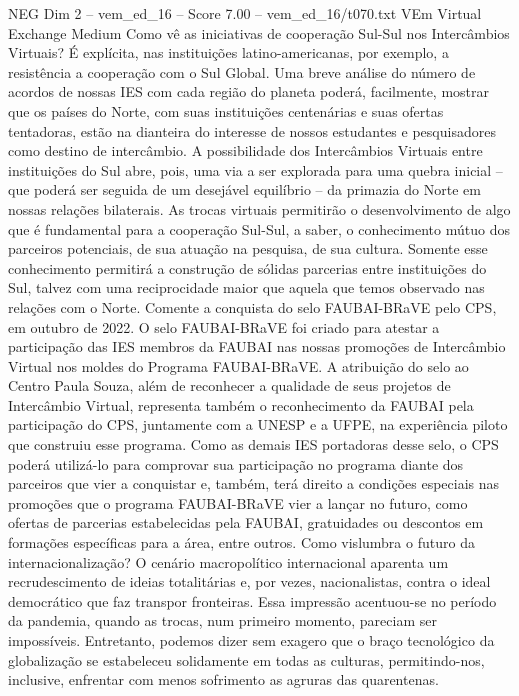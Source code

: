 \begin{textsample}{NEG Dim 2 – vem\_ed\_16 – Score 7.00 – vem\_ed\_16/t070.txt}  \label{ex:f2_neg_105}
VEm Virtual Exchange Medium Como vê as iniciativas de cooperação Sul-Sul nos Intercâmbios Virtuais?
É explícita, nas instituições latino-americanas, por exemplo, a resistência a cooperação com o Sul Global.
Uma breve análise do número de acordos de nossas IES com cada região do planeta poderá, facilmente, mostrar que os países do Norte, com suas instituições centenárias e suas ofertas tentadoras, estão na dianteira do interesse de nossos estudantes e pesquisadores como destino de intercâmbio.
A possibilidade dos Intercâmbios Virtuais entre instituições do Sul abre, pois, uma via a ser explorada para uma quebra inicial – que poderá ser seguida de um desejável equilíbrio – da primazia do Norte em nossas relações bilaterais.
As trocas virtuais permitirão o desenvolvimento de algo que é fundamental para a cooperação Sul-Sul, a saber, o conhecimento mútuo dos parceiros potenciais, de sua atuação na pesquisa, de sua cultura.
Somente esse conhecimento permitirá a construção de sólidas parcerias entre instituições do Sul, talvez com uma reciprocidade maior que aquela que temos observado nas relações com o Norte.
Comente a conquista do selo FAUBAI-BRaVE pelo CPS, em outubro de 2022.
O selo FAUBAI-BRaVE foi criado para atestar a participação das IES membros da FAUBAI nas nossas promoções de Intercâmbio Virtual nos moldes do Programa FAUBAI-BRaVE.
A atribuição do selo ao Centro Paula Souza, além de reconhecer a qualidade de seus projetos de Intercâmbio Virtual, representa também o reconhecimento da FAUBAI pela participação do CPS, juntamente com a UNESP e a UFPE, na experiência piloto que construiu esse programa.
Como as demais IES portadoras desse selo, o CPS poderá utilizá-lo para comprovar sua participação no programa diante dos parceiros que vier a conquistar e, também, terá direito a condições especiais nas promoções que o programa FAUBAI-BRaVE vier a lançar no futuro, como ofertas de parcerias estabelecidas pela FAUBAI, gratuidades ou descontos em formações específicas para a área, entre outros.
Como vislumbra o futuro da internacionalização?
O cenário macropolítico internacional aparenta um recrudescimento de ideias totalitárias e, por vezes, nacionalistas, contra o ideal democrático que faz transpor fronteiras.
Essa impressão acentuou-se no período da pandemia, quando as trocas, num primeiro momento, pareciam ser impossíveis.
Entretanto, podemos dizer sem exagero que o braço tecnológico da globalização se estabeleceu solidamente em todas as culturas, permitindo-nos, inclusive, enfrentar com menos sofrimento as agruras das quarentenas.

\end{textsample}
